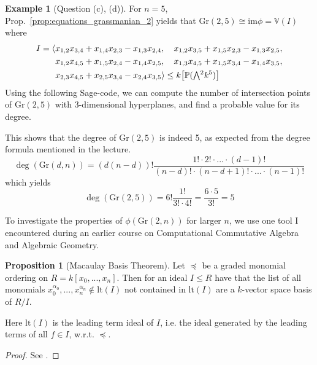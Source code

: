 \documentclass{scrartcl}
\newcommand{\V}{\mathbb{V}}
\newcommand{\Proj}{\mathbb{P}}
\newcommand{\Gr}{\mathrm{Gr}}
\newcommand{\extpow}{\mathchoice{{\textstyle\bigwedge}}
    {{\bigwedge}}
    {{\textstyle\wedge}}
    {{\scriptstyle\wedge}}}
\theoremstyle{definition}
\newtheorem{example}[subsection]{Example}
\newtheorem{proposition}[subsection]{Proposition}
\begin{document}
\begin{example}[Question (c), (d)]
    For $n = 5$, Prop.~\ref{prop:equations_grassmanian_2} yields that $\Gr(2, 5) \cong \mathrm{im}\phi = \V(I)$ where
    \begin{align*}
        I = \langle &x_{1, 2} x_{3, 4} + x_{1, 4} x_{2, 3} - x_{1, 3} x_{2, 4}, \quad x_{1, 2} x_{3, 5} + x_{1, 5} x_{2, 3} - x_{1, 3} x_{2, 5}, \\
        &x_{1, 2} x_{4, 5} + x_{1, 5} x_{2, 4} - x_{1, 4} x_{2, 5}, \quad x_{1, 3} x_{4, 5} + x_{1, 5} x_{3, 4} - x_{1, 4} x_{3, 5}, \\ 
        &x_{2, 3} x_{4, 5} + x_{2, 5} x_{3, 4} - x_{2, 4} x_{3, 5} \rangle \leq k\bigl[ \Proj(\extpow^2 k^5) \bigr]
    \end{align*}
    Using the following Sage-code, we can compute the number of intersection points of $\Gr(2, 5)$ with 3-dimensional hyperplanes, and find a probable value for its degree.
    
    This shows that the degree of $\Gr(2, 5)$ is indeed 5, as expected from the degree formula mentioned in the lecture.
    \begin{equation*}
        \deg(\Gr(d, n)) = (d(n - d))! \frac {1! \cdot 2! \cdot ... \cdot (d - 1)!} {(n - d)! \cdot (n - d + 1)! \cdot ... \cdot (n - 1)!}
    \end{equation*}
    which yields
    \begin{equation*}
        \deg(\Gr(2, 5)) = 6! \frac {1!} {3! \cdot 4!} = \frac {6 \cdot 5} {3!} = 5
    \end{equation*}
\end{example}
To investigate the properties of $\phi(\Gr(2, n))$ for larger $n$, we use one tool I encountered during an earlier course on Computational Commutative Algebra and Algebraic Geometry.
\begin{proposition}[Macaulay Basis Theorem]
    \label{prop:macaulay_basis_theorem}
    Let $\preceq$ be a graded monomial ordering on $R = k[x_0, ..., x_n]$.
    Then for an ideal $I \leq R$ have that the list of all monomials $x_0^{\alpha_0}, ..., x_n^{\alpha_n} \notin \mathrm{lt}(I)$ not contained in $\mathrm{lt}(I)$ are a $k$-vector space basis of $R/I$.

    Here $\mathrm{lt}(I)$ is the leading term ideal of $I$, i.e. the ideal generated by the leading terms of all $f \in I$, w.r.t. $\preceq$.
\end{proposition}
\begin{proof}
    See \cite{kreuzer}.
\end{proof}
\end{document}
